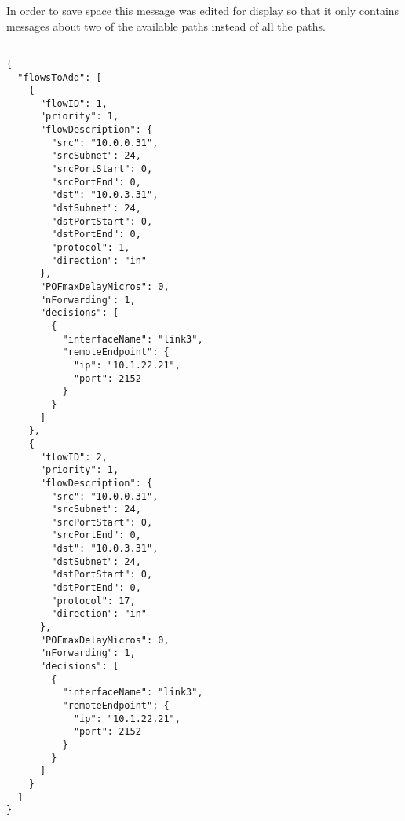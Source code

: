 In order to save space this message was edited for display so that it only contains messages about two of the available paths instead of all the paths.

\clearpage

\begin{lstlisting}[style=json, caption={Format of Flow Forwarding Decisions from Control Plane}, label={lst:flow}]

{
  "flowsToAdd": [
    {
      "flowID": 1,
      "priority": 1,
      "flowDescription": {
        "src": "10.0.0.31",
        "srcSubnet": 24,
        "srcPortStart": 0,
        "srcPortEnd": 0,
        "dst": "10.0.3.31",
        "dstSubnet": 24,
        "dstPortStart": 0,
        "dstPortEnd": 0,
        "protocol": 1,
        "direction": "in"
      },
      "POFmaxDelayMicros": 0,
      "nForwarding": 1,
      "decisions": [
        {
          "interfaceName": "link3",
          "remoteEndpoint": {
            "ip": "10.1.22.21",
            "port": 2152
          }
        }
      ]
    },
    {
      "flowID": 2,
      "priority": 1,
      "flowDescription": {
        "src": "10.0.0.31",
        "srcSubnet": 24,
        "srcPortStart": 0,
        "srcPortEnd": 0,
        "dst": "10.0.3.31",
        "dstSubnet": 24,
        "dstPortStart": 0,
        "dstPortEnd": 0,
        "protocol": 17,
        "direction": "in"
      },
      "POFmaxDelayMicros": 0,
      "nForwarding": 1,
      "decisions": [
        {
          "interfaceName": "link3",
          "remoteEndpoint": {
            "ip": "10.1.22.21",
            "port": 2152
          }
        }
      ]
    }
  ]
}


\end{lstlisting}

\clearpage

